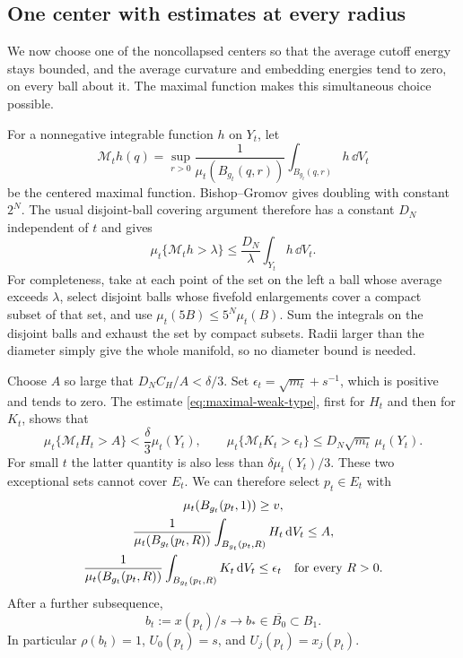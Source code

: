 \subsection{One center with estimates at every radius}

We now choose one of the noncollapsed centers so that the average cutoff
energy stays bounded, and the average curvature and embedding energies
tend to zero, on every ball about it.  The maximal function makes this
simultaneous choice possible.

For a nonnegative integrable function $h$ on $Y_t$, let
\[
 \mathcal M_t h(q)=\sup_{r>0}
       \frac1{\mu_t(B_{g_t}(q,r))}
                   \int_{B_{g_t}(q,r)}h\,\dd V_t
\]
be the centered maximal function.  Bishop--Gromov gives doubling with
constant $2^N$.  The usual disjoint-ball covering argument therefore
has a constant $D_N$ independent of $t$ and gives
\begin{equation}
 \mu_t\{\mathcal M_t h>\lambda\}
       \le\frac{D_N}{\lambda}\int_{Y_t}h\,\dd V_t.
 \label{eq:maximal-weak-type}
\end{equation}
For completeness, take at each point of the set on the left a ball
whose average exceeds $\lambda$, select disjoint balls whose fivefold
enlargements cover a compact subset of that set, and use
$\mu_t(5B)\le5^N\mu_t(B)$.  Sum the integrals on the disjoint balls
and exhaust the set by compact subsets.  Radii larger than the diameter
simply give the whole manifold, so no diameter bound is needed.

Choose $A$ so large that $D_NC_H/A<\delta/3$.  Set
$\epsilon_t=\sqrt{m_t}+s^{-1}$, which is positive and tends to zero.
The estimate \eqref{eq:maximal-weak-type}, first for $H_t$ and then for
$K_t$, shows that
\[
 \mu_t\{\mathcal M_tH_t>A\}<\frac\delta3\mu_t(Y_t),\qquad
 \mu_t\{\mathcal M_tK_t>\epsilon_t\}
       \le D_N\sqrt{m_t}\,\mu_t(Y_t).
\]
For small $t$ the latter quantity is also less than
$\delta\mu_t(Y_t)/3$.  These two exceptional sets cannot cover $E_t$.
We can therefore select $p_t\in E_t$ with
\begin{equation}
 \begin{gathered}
 \mu_t(B_{g_t}(p_t,1))\ge v,\\
 \frac1{\mu_t(B_{g_t}(p_t,R))}
       \int_{B_{g_t}(p_t,R)}H_t\,\mathrm d V_t\le A,\\
 \frac1{\mu_t(B_{g_t}(p_t,R))}
       \int_{B_{g_t}(p_t,R)}K_t\,\mathrm d V_t\le\epsilon_t
       \quad\hbox{for every }R>0.
 \end{gathered}
 \label{eq:good-center}
\end{equation}
After a further subsequence,
\[
 b_t:=x(p_t)/s\longrightarrow b_*\in\overline{B_0}\subset B_1.
\]
In particular $\rho(b_t)=1$,
$U_0(p_t)=s$, and $U_j(p_t)=x_j(p_t)$.

